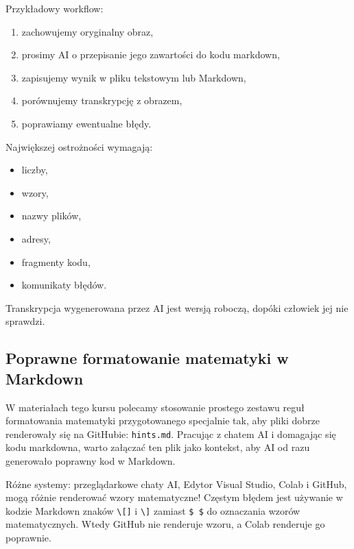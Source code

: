 \documentclass[11pt, a4paper]{article}
\begin{document}
Przykładowy workflow:
\begin{enumerate}
    \item zachowujemy oryginalny obraz,
    \item prosimy AI o przepisanie jego zawartości do kodu markdown,
    \item zapisujemy wynik w pliku tekstowym lub Markdown,
    \item porównujemy transkrypcję z obrazem,
    \item poprawiamy ewentualne błędy.
\end{enumerate}

Największej ostrożności wymagają:
\begin{itemize}
    \item liczby,
    \item wzory,
    \item nazwy plików,
    \item adresy,
    \item fragmenty kodu,
    \item komunikaty błędów.
\end{itemize}

Transkrypcja wygenerowana przez AI jest wersją roboczą, dopóki człowiek jej nie sprawdzi.

\hrulefill

\subsection{Poprawne formatowanie matematyki w Markdown}
W materiałach tego kursu polecamy stosowanie prostego zestawu reguł formatowania matematyki przygotowanego specjalnie tak, aby pliki dobrze renderowały się na GitHubie: \texttt{hints.md}. Pracując z chatem AI i domagając się kodu markdowna, warto załączać ten plik jako kontekst, aby AI od razu generowało poprawny kod w Markdown.

Różne systemy: przeglądarkowe chaty AI, Edytor Visual Studio, Colab i GitHub, mogą różnie renderować wzory matematyczne! Częstym błędem jest używanie w kodzie Markdown znaków \texttt{\textbackslash[]} i \texttt{\textbackslash]} zamiast \texttt{\$ \$} do oznaczania wzorów matematycznych. Wtedy GitHub nie renderuje wzoru, a Colab renderuje go poprawnie.

\hrulefill
\end{document}
